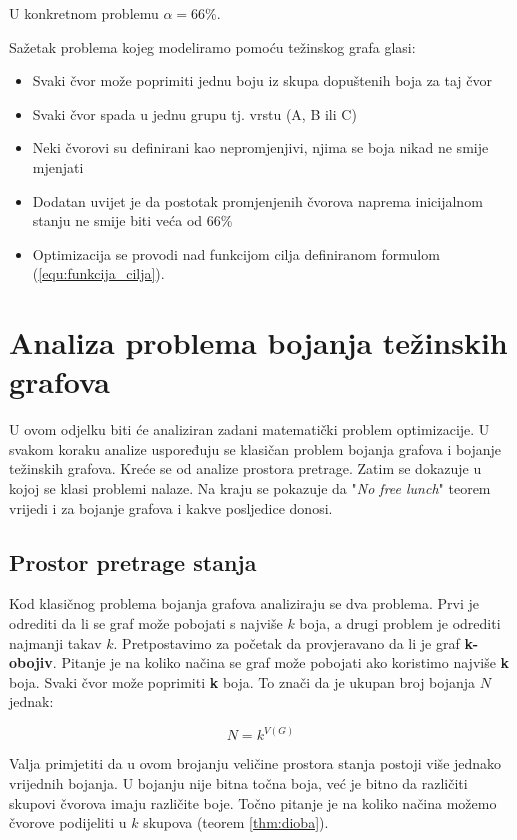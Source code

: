 \documentclass[times, utf8, diplomski, numeric]{fer}
\begin{document}
U konkretnom problemu $\alpha=66\%$.

Sažetak problema kojeg modeliramo pomoću težinskog grafa glasi:
\begin{itemize}
	\item Svaki čvor može poprimiti jednu boju iz skupa dopuštenih boja za taj čvor
	\item Svaki čvor spada u jednu grupu tj. vrstu (A, B ili C)
	\item Neki čvorovi su definirani kao nepromjenjivi, njima se boja nikad ne smije mjenjati
	\item Dodatan uvijet je da postotak promjenjenih čvorova naprema inicijalnom stanju ne smije biti veća od 66\%
	\item Optimizacija se provodi nad funkcijom cilja definiranom formulom (\ref{equ:funkcija_cilja}).
\end{itemize}

\section{Analiza problema bojanja težinskih grafova}

U ovom odjelku biti će analiziran zadani matematički problem optimizacije. U svakom koraku analize uspoređuju se klasičan problem bojanja grafova i bojanje težinskih grafova. Kreće se od analize prostora pretrage. Zatim se dokazuje u kojoj se klasi problemi nalaze. Na kraju se pokazuje da "\emph{No free lunch}" teorem vrijedi i za bojanje grafova i kakve posljedice donosi.

\subsection{Prostor pretrage stanja}

Kod klasičnog problema bojanja grafova analiziraju se dva problema. Prvi je odrediti da li se graf može pobojati s najviše $k$ boja, a drugi problem je odrediti najmanji takav $k$. Pretpostavimo za početak da provjeravano da li je graf \textbf{k-obojiv}. Pitanje je na koliko načina se graf može pobojati ako koristimo najviše \textbf{k} boja. Svaki čvor može poprimiti \textbf{k} boja. To znači da je ukupan broj bojanja $N$ jednak: 

\begin{equation}
N = k^{V(G)} 
\end{equation}

Valja primjetiti da u ovom brojanju veličine prostora stanja postoji više jednako vrijednih bojanja. U bojanju nije bitna točna boja, već je bitno da različiti skupovi čvorova imaju različite boje. Točno pitanje je na koliko načina možemo čvorove podijeliti u $k$ skupova (teorem \ref{thm:dioba}).  
\end{document}
